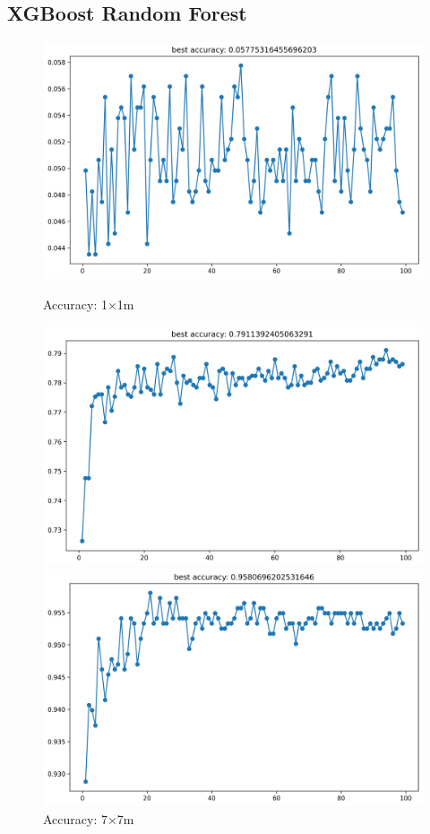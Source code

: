 \documentclass[runningheads]{llncs}
\begin{document}
\clearpage

\subsection*{XGBoost Random Forest}

\begin{figure}[H]
	\centering
	\begin{minipage}{0.32\textwidth}
		\centering
		\includegraphics[width=\textwidth]{figures/xgbrf_acc_1.png}
		\caption*{Accuracy: 1×1m}
	\end{minipage}
	\hfill
	\begin{minipage}{0.32\textwidth}
		\centering
		\includegraphics[width=\textwidth]{figures/xgbrf_acc_7.png}
		\caption*{Accuracy: 7×7m}
	\end{minipage}
	\hfill
	\begin{minipage}{0.32\textwidth}
		\centering
		\includegraphics[width=\textwidth]{figures/xgbrf_acc_15.png}

\end{minipage}
\end{figure}
\end{document}
